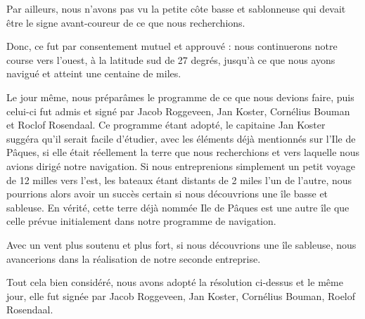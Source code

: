 \documentclass{article}
\begin{document}
        
    Par ailleurs, nous n'avons pas vu la petite côte basse et sablonneuse qui devait être le signe avant-coureur de ce que nous recherchions. 
            
        
    Donc, ce fut par consentement mutuel et approuvé : nous continuerons notre course vers l'ouest, à la latitude sud de 27 degrés, jusqu'à ce que nous ayons navigué et atteint une centaine de miles. 
            
        
    Le jour même, nous préparâmes le programme de ce que nous devions faire, puis celui-ci fut admis et signé par Jacob Roggeveen, Jan Koster, Cornélius Bouman et Roclof Rosendaal. Ce programme étant adopté, le capitaine Jan Koster suggéra qu'il serait facile d'étudier, avec les éléments déjà mentionnés sur l'Ile de Pâques, si elle était réellement la terre que nous recherchions et vers laquelle nous avions dirigé notre navigation. Si nous entreprenions simplement un petit voyage de 12 milles vers l'est, les bateaux étant distants de 2 miles l'un de l'autre, nous pourrions alors avoir un succès certain si nous découvrions une île basse et sableuse. En vérité, cette terre déjà nommée Ile de Pâques est une autre île que celle prévue initialement dans notre programme de navigation.
            
        
    Avec un vent plus soutenu et plus fort, si nous découvrions une île sableuse, nous avancerions dans la réalisation de notre seconde entreprise.
            
        
    Tout cela bien considéré, nous avons adopté la résolution ci-dessus et le même jour, elle fut signée par Jacob Roggeveen, Jan Koster, Cornélius Bouman, Roelof Rosendaal.
         
      
   
        
\end{document}
